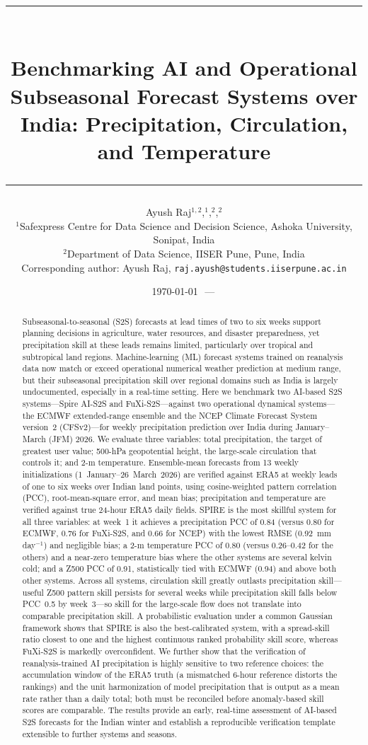 \documentclass[11pt]{article}
\title{%
  \noindent\rule{\linewidth}{0.8pt}\\[0.4em]
  \bfseries Benchmarking AI and Operational Subseasonal Forecast
  Systems over India: Precipitation, Circulation, and Temperature\\[0.4em]
  \noindent\rule{\linewidth}{0.8pt}%
}
\author{%
  Ayush Raj$^{1,2}$,\quad \ph{Author Two (TBD)}$^{1}$,\quad \ph{Author Three (TBD)}$^{2}$,\quad \ph{Author Four (TBD)}$^{2}$\\[6pt]
  $^{1}$Safexpress Centre for Data Science and Decision Science, Ashoka University, Sonipat, India\\
  $^{2}$Department of Data Science, IISER Pune, Pune, India\\[4pt]
  \normalsize Corresponding author: Ayush Raj, \texttt{raj.ayush@students.iiserpune.ac.in}
}
\date{\today\ \,---\, \ph{Draft v0.1; all numerical results are
placeholders pending computation. Not for distribution.}}
\begin{document}
\maketitle

\begin{abstract}
\noindent
Subseasonal-to-seasonal (S2S) forecasts at lead times of two to six
weeks support planning decisions in agriculture, water resources, and
disaster preparedness, yet precipitation skill at these leads remains
limited, particularly over tropical and subtropical land regions.
Machine-learning (ML) forecast systems trained on reanalysis data now
match or exceed operational numerical weather prediction at medium
range, but their subseasonal precipitation skill over regional domains
such as India is largely undocumented, especially in a real-time
setting. Here we benchmark two AI-based S2S systems---Spire AI-S2S and
FuXi-S2S---against two operational dynamical systems---the ECMWF
extended-range ensemble and the NCEP Climate Forecast System version~2
(CFSv2)---for weekly precipitation prediction over India during
January--March (JFM) 2026. We evaluate three variables: total
precipitation, the target of greatest user value; 500-hPa geopotential
height, the large-scale circulation that controls it; and 2-m
temperature. Ensemble-mean forecasts from 13 weekly initializations
(1~January--26~March~2026) are verified against ERA5 at weekly leads of
one to six weeks over Indian land points, using cosine-weighted pattern
correlation (PCC), root-mean-square error, and mean bias; precipitation
and temperature are verified against true 24-hour ERA5 daily fields.
SPIRE is the most skillful system for all three variables: at week~1 it
achieves a precipitation PCC of 0.84 (versus 0.80 for ECMWF, 0.76 for
FuXi-S2S, and 0.66 for NCEP) with the lowest RMSE (0.92~mm\,day$^{-1}$)
and negligible bias; a 2-m temperature PCC of 0.80 (versus 0.26--0.42 for
the others) and a near-zero temperature bias where the other systems are
several kelvin cold; and a Z500 PCC of 0.91, statistically tied with
ECMWF (0.94) and above both other systems. Across all systems,
circulation skill greatly outlasts precipitation skill---useful Z500
pattern skill persists for several weeks while precipitation skill falls
below PCC~0.5 by week~3---so skill for the large-scale flow does not
translate into comparable precipitation skill. A probabilistic
evaluation under a common Gaussian framework shows that SPIRE is also the
best-calibrated system, with a spread-skill ratio closest to one and the
highest continuous ranked probability skill score, whereas FuXi-S2S is
markedly overconfident. We further show that the verification of
reanalysis-trained AI precipitation is highly sensitive to two reference
choices: the accumulation window of the ERA5 truth (a mismatched 6-hour
reference distorts the rankings) and the unit harmonization of model
precipitation that is output as a mean rate rather than a daily total;
both must be reconciled before anomaly-based skill scores are comparable. The results provide an
early, real-time assessment of AI-based S2S forecasts for the Indian
winter and establish a reproducible verification template extensible to
further systems and seasons.
\end{abstract}
\end{document}
